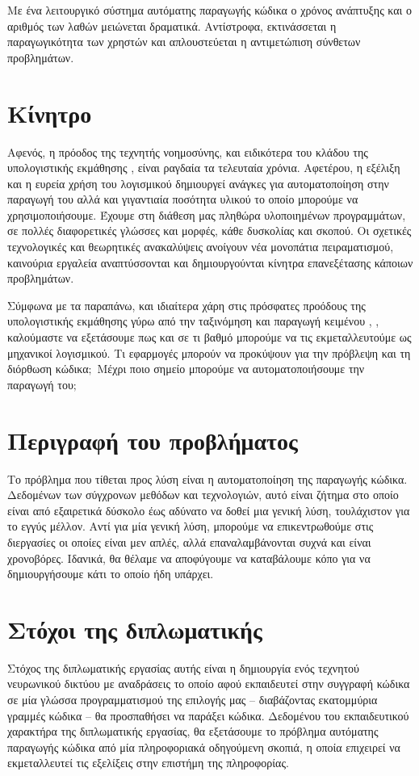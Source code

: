Με ένα λειτουργικό σύστημα αυτόματης παραγωγής κώδικα ο χρόνος ανάπτυξης και ο αριθμός των λαθών μειώνεται δραματικά. 
Αντίστροφα, εκτινάσσεται η παραγωγικότητα των χρηστών και απλουστεύεται η αντιμετώπιση σύνθετων προβλημάτων.

\section{Κίνητρο}
Αφενός, η πρόοδος της τεχνητής νοημοσύνης, και ειδικότερα του κλάδου της υπολογιστικής εκμάθησης , είναι ραγδαία τα τελευταία χρόνια.
Αφετέρου, η εξέλιξη και η ευρεία χρήση του λογισμικού δημιουργεί ανάγκες για αυτοματοποίηση στην παραγωγή του αλλά και γιγαντιαία ποσότητα υλικού το οποίο μπορούμε να χρησιμοποιήσουμε.
Έχουμε στη διάθεση μας πληθώρα υλοποιημένων προγραμμάτων, σε πολλές διαφορετικές γλώσσες και μορφές, κάθε δυσκολίας και σκοπού.
Οι σχετικές τεχνολογικές και θεωρητικές ανακαλύψεις ανοίγουν νέα μονοπάτια πειραματισμού, καινούρια εργαλεία αναπτύσσονται και δημιουργούνται κίνητρα επανεξέτασης κάποιων προβλημάτων.

Σύμφωνα με τα παραπάνω, και ιδιαίτερα χάρη στις πρόσφατες προόδους της υπολογιστικής εκμάθησης γύρω από την ταξινόμηση και παραγωγή κειμένου \cite{Graves2013}, \cite{Liu2016}, καλούμαστε να εξετάσουμε πως και σε τι βαθμό μπορούμε να τις εκμεταλλευτούμε ως μηχανικοί λογισμικού. Τι εφαρμογές μπορούν να προκύψουν για την πρόβλεψη και τη διόρθωση κώδικα$;$ Μέχρι ποιο σημείο μπορούμε να αυτοματοποιήσουμε την παραγωγή του$;$

\section{Περιγραφή του προβλήματος}
Το πρόβλημα που τίθεται προς λύση είναι η αυτοματοποίηση της παραγωγής κώδικα. 
Δεδομένων των σύγχρονων μεθόδων και τεχνολογιών, αυτό είναι ζήτημα στο οποίο είναι από εξαιρετικά δύσκολο έως αδύνατο να δοθεί μια γενική λύση, τουλάχιστον για το εγγύς μέλλον.
Αντί για μία γενική λύση, μπορούμε να επικεντρωθούμε στις διεργασίες οι οποίες είναι μεν απλές, αλλά επαναλαμβάνονται συχνά και είναι χρονοβόρες.
Ιδανικά, θα θέλαμε να αποφύγουμε να καταβάλουμε κόπο για να δημιουργήσουμε κάτι το οποίο ήδη υπάρχει. 

\section{Στόχοι της διπλωματικής}

Στόχος της διπλωματικής εργασίας αυτής είναι η δημιουργία ενός τεχνητού νευρωνικού δικτύου με αναδράσεις  το οποίο αφού εκπαιδευτεί στην συγγραφή κώδικα σε μία γλώσσα προγραμματισμού της επιλογής μας -- διαβάζοντας εκατομμύρια γραμμές κώδικα -- θα προσπαθήσει να παράξει κώδικα. Δεδομένου του εκπαιδευτικού χαρακτήρα της διπλωματικής εργασίας, θα εξετάσουμε το πρόβλημα αυτόματης παραγωγής κώδικα από μία πληροφοριακά οδηγούμενη  σκοπιά, η οποία επιχειρεί να εκμεταλλευτεί τις εξελίξεις στην επιστήμη της πληροφορίας.

